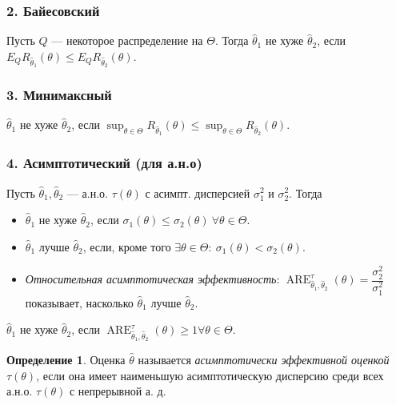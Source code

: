 \documentclass[12pt]{report}
\theoremstyle{definition}
\newtheorem{definition}{Определение}
\begin{document}
\subsubsection{2. Байесовский}
Пусть $Q$ — некоторое распределение на $\Theta$. Тогда $\widehat{\theta}_1$ не хуже $\widehat{\theta}_2$, если  $E_QR_{\widehat\theta_1}(\theta) \leqslant E_QR_{\widehat\theta_2}(\theta)$.

\subsubsection{3. Минимаксный}
$\widehat{\theta}_1$ не хуже $\widehat{\theta}_2$, если $\displaystyle\sup_{\theta \in \Theta}R_{\widehat\theta_1}(\theta) \leqslant \displaystyle\sup_{\theta \in \Theta}R_{\widehat\theta_2}(\theta)$.

\subsubsection{4. Асимптотический (для а.н.о)}
Пусть $\widehat{\theta}_1, \widehat{\theta}_2$ — а.н.о. $\tau(\theta)$ с асимпт. дисперсией $\sigma_1^2$ и $\sigma^2_2$. Тогда
\begin{itemize}
	\item $\widehat{\theta}_1$ не хуже  $\widehat{\theta}_2$, если $\sigma_1(\theta) \leqslant \sigma_2(\theta)\ \forall \theta \in \Theta$.
	\item $\widehat{\theta}_1$ лучше  $\widehat{\theta}_2$, если, кроме того $\exists \theta \in \Theta: \ \sigma_1(\theta) < \sigma_2(\theta)$.
	\item \emph{Относительная асимптотическая эффективность}: $\operatorname{ARE}_{\widehat{\theta}_1, \widehat{\theta}_2}^{\tau}(\theta) = \dfrac{\sigma_2^2}{\sigma_1^2}$ показывает, насколько $\widehat{\theta}_1$ лучше  $\widehat{\theta}_2$.
\end{itemize}

$\widehat{\theta}_1$ не хуже  $\widehat{\theta}_2$, если $\operatorname{ARE}_{\widehat{\theta}_1, \widehat{\theta}_2}^{\tau}(\theta) \geqslant 1 \forall \theta \in \Theta$.

\begin{definition}
	Оценка $\widehat{\theta}$ называется \emph{асимптотически эффективной оценкой $\tau(\theta)$}, если она имеет наименьшую асимптотическую дисперсию среди всех а.н.о. $\tau(\theta)$ с непрерывной а. д.
\end{definition}
\end{document}
